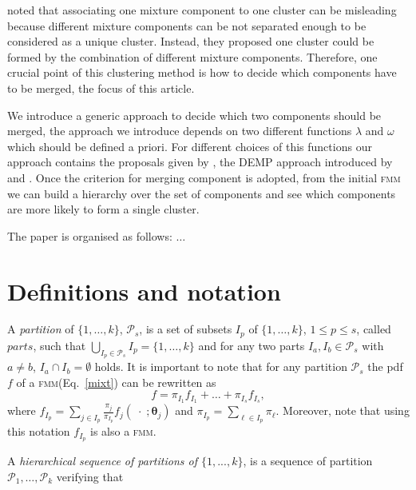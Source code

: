 \documentclass[10pt, a4paper]{article}
\newcommand{\m}[1]{\boldsymbol{#1}}
\newcommand{\fmm}{\textsc{fmm}\xspace}
\begin{document}
\begin{spacing}{1.9}
\cite{lee2004combining,hennig2010methods,baudry2010combining,melnykov2013distribution,pastore2013merging} noted that associating one mixture component to one cluster can be misleading because different mixture components can be not separated enough to be considered as a unique cluster. Instead, they proposed one cluster could be formed by the combination of different mixture components. Therefore, one crucial point of this clustering method is how to decide which components have to be merged, the focus of this article.


We introduce a generic approach to decide which two components should be merged, the approach we introduce depends on two different functions $\lambda$ and $\omega$ which should be defined a priori. For different choices of this functions our approach contains the proposals given by \cite{baudry2010combining}, the DEMP approach introduced by \cite{hennig2010methods} and \cite{longford2014}. Once the criterion for merging component is adopted, from the initial \fmm we can build a hierarchy over the set of components and see which components are more likely to form a single cluster.

The paper is organised as follows: $\dots$


\section{Definitions and notation}

%
A \emph{partition} of $\{1, \dots, k\}$, $\mathcal{P}_s$,  is a set of subsets $I_p$ of $\{1, \dots, k\}$, $1\leq p \leq s$, called $parts$, such that $\bigcup_{I_p \in \mathcal{P}_s} I_p = \{1, \dots, k\}$ and for any two parts $I_a, I_b \in \mathcal{P}_s$ with $a \neq b$, $I_a \cap I_b = \emptyset$ holds. It is important to note that for any partition  $\mathcal{P}_s$ the pdf $f$ of a \fmm (Eq.~\ref{mixt}) can be rewritten as
\begin{equation}
f = \pi_{I_1} f_{I_1} + \dots + \pi_{I_s} f_{I_s},
\label{mixt_part}
\end{equation}
where $f_{I_p} = \sum_{j \in I_p} \frac{\pi_j}{\pi_{I_p}} f_j(\;\cdot\; ; \m\theta_j)$ and $\pi_{I_p} = \sum_{\ell \in I_p} \pi_\ell$. Moreover, note that using this notation $f_{I_p}$ is also a \fmm.



A \emph{hierarchical sequence of partitions of $\{1,...,k\}$}, is a sequence of partition $\mathcal{P}_1, \dots, \mathcal{P}_k$ verifying that
  

\end{spacing}
\end{document}
